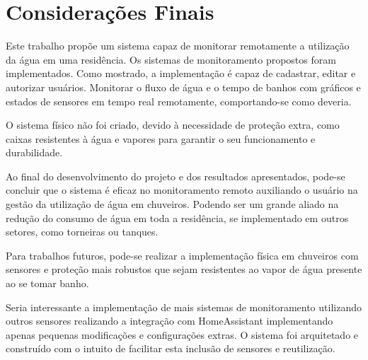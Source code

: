 \chapter{Considerações Finais}

Este trabalho propõe um sistema capaz de monitorar remotamente a utilização da água em uma residência. Os sistemas de monitoramento propostos foram implementados. Como mostrado, a implementação é capaz de cadastrar, editar e autorizar usuários. Monitorar o fluxo de água e o tempo de banhos com gráficos e estados de sensores em tempo real remotamente, comportando-se como deveria.

O sistema físico não foi criado, devido à necessidade de proteção extra, como caixas resistentes à água e vapores para garantir o seu funcionamento e durabilidade.

Ao final do desenvolvimento do projeto e dos resultados apresentados, pode-se concluir que o sistema é eficaz no monitoramento remoto auxiliando o usuário na gestão da utilização de água em chuveiros. Podendo ser um grande aliado na redução do consumo de água em toda a residência, se implementado em outros setores, como torneiras ou tanques.

Para trabalhos futuros, pode-se realizar a implementação física em chuveiros com sensores e proteção mais robustos que sejam resistentes ao vapor de água presente ao se tomar banho. 

Seria interessante a implementação de mais sistemas de monitoramento utilizando outros sensores realizando a integração com HomeAssistant implementando apenas pequenas modificações e configurações extras. O sistema foi arquitetado e construído com o intuito de facilitar esta inclusão de sensores e reutilização.